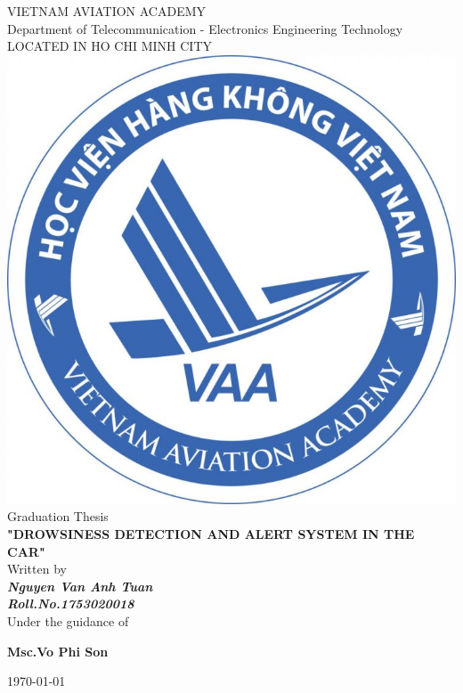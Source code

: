 \documentclass[a4paper,13pt]{report}
\begin{document}
    \begin{titlepage}
        \centering
        
        \LARGE{\textsc{VIETNAM AVIATION ACADEMY}}\\
        \vspace{3mm}
        \normalsize{Department of Telecommunication - Electronics Engineering Technology} \\
        \vspace{3mm}
        \large{LOCATED IN HO CHI MINH CITY} \\
        \vspace{3mm}
        \includegraphics[scale=0.3]{img/logo.png} \\
        \vspace{3mm}
        \large{Graduation Thesis} \\
        \vspace{10mm}
        \huge{\textbf{"DROWSINESS DETECTION AND ALERT SYSTEM IN THE CAR"}} \\ 
        \vspace{20mm}
        \normalsize{Written by} \\ 
        \vspace{3mm}
        \large{\textbf{\textit{Nguyen Van Anh Tuan}}} \\ 
        \vspace{3mm}
        \large{\textbf{\textit{Roll.No.1753020018}}} \\ 
        \vspace{15mm}
        \large{Under the guidance of} \\
        \vspace{7mm}
        \centerline{\textbf{\large{Msc.Vo Phi Son}}} 
        \vspace{3.5cm}
        \centerline{\today}
    \end{titlepage}
\end{document}
